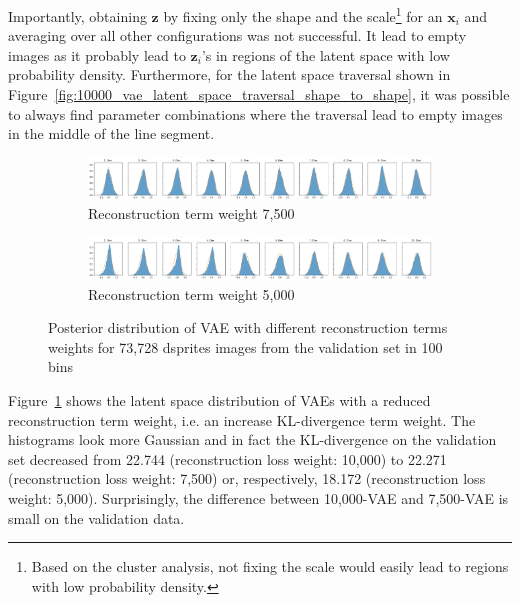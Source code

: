 Importantly, obtaining $\bm{z}$ by fixing only the shape and the scale\footnote{Based on the cluster analysis, not fixing the scale would easily lead to regions with low probability density.} for an $\bm{x}_i$ and averaging over all other configurations was not successful.
It lead to empty images as it probably lead to $\bm{z}_i$'s in regions of the latent space with low probability density.
Furthermore, for the latent space traversal shown in Figure~\ref{fig:10000_vae_latent_space_traversal_shape_to_shape}, it was possible to always find parameter combinations where the traversal lead to empty images in the middle of the line segment.

\begin{figure}
    \centering
    \begin{subfigure}{\textwidth}
        \centering
        \includegraphics[width=\textwidth]{images/latent_space_entanglement/vae_dsprites_lf_7500_dist.png}
        \caption{Reconstruction term weight 7,500}
    \end{subfigure}
    \begin{subfigure}{\textwidth}
        \centering
        \includegraphics[width=\textwidth]{images/latent_space_entanglement/vae_dsprites_lf_5000_dist.png}
        \caption{Reconstruction term weight 5,000}
    \end{subfigure}
    \caption[VAE Latent Space Distribution - Different Reconstruction Term Weights]{Posterior distribution of VAE with different reconstruction terms weights for 73,728 dsprites images from the validation set in 100 bins}
    \label{fig:7500_5000_vae_latent_space_distribution_scales_and_shapes}
\end{figure}

Figure~\ref{fig:7500_5000_vae_latent_space_distribution_scales_and_shapes} shows the latent space distribution of \acp{VAE} with a reduced reconstruction term weight, i.e. an increase \ac{KL-divergence} term weight.
The histograms look more Gaussian and in fact the \ac{KL-divergence} on the validation set decreased from 22.744 (reconstruction loss weight: 10,000) to 22.271 (reconstruction loss weight: 7,500) or, respectively, 18.172 (reconstruction loss weight: 5,000).
Surprisingly, the difference between 10,000-\ac{VAE} and 7,500-\ac{VAE} is small on the validation data.

